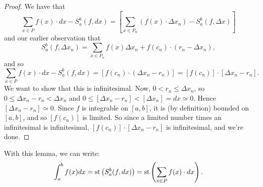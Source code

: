 \begin{proof}
    We have that 
    \[ 
    \sum_{x \in P} f(x) \cdot dx - S_a^b(f, dx) = \left[\sum_{x \in P_n} \left(f(x) \cdot \Delta x_n\right) - S_a^b(f, \Delta x) \right]
    \]
    and our earlier observation that
    \[ 
    S_a^b(f, \Delta x_n) = \sum_{x \in P_n} f(x) \Delta x_n + f(c_n) \cdot (r_n - \Delta x_n), 
    \]
    and so 
    \[ 
    \sum_{x \in P} f(x) \cdot dx - S_a^b(f, dx) = [f(c_n) \cdot (\Delta x_n - r_n)] = [f(c_n)] \cdot [\Delta x_n - r_n].
    \]
    We want to show that this is infinitesimal. Now, $0 < r_n \leq \Delta x_n$, so $0 \leq \Delta x_n - r_n < \Delta x_n$ and $0 \leq [\Delta x_n - r_n] < [\Delta x_n] = dx \simeq 0$. Hence $[\Delta x_n - r_n] \simeq 0$. Since $f$ is integrable on $[a, b]$, it is (by definition) bounded on $[a, b]$, and so $[f(c_n)]$ is limited. So since a limited number times an infinitesimal is infinitesimal, $[f(c_n)] \cdot [\Delta x_n - r_n]$ is infinitesimal, and we're done.
\end{proof}
With this lemma, we can write:
\[
\int_a^b f(x)dx = \operatorname{st}\left(S_a^b(f, dx)\right) = \operatorname{st}\left(\sum_{x \in P} f(x) \cdot dx\right).
\]
